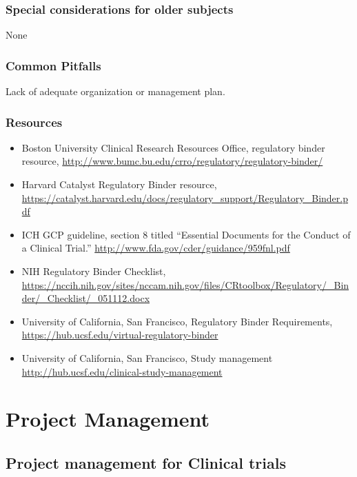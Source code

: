 \documentclass[]{book}
\providecommand{\tightlist}{%
  \setlength{\itemsep}{0pt}\setlength{\parskip}{0pt}}
\theoremstyle{definition}
\theoremstyle{definition}
\theoremstyle{definition}
\theoremstyle{remark}
\begin{document}
\subsection{Special considerations for older
subjects}\label{special-considerations-for-older-subjects-11}

None

\subsection{Common Pitfalls}\label{common-pitfalls-14}

Lack of adequate organization or management plan.

\subsection{Resources}\label{resources-16}

\begin{itemize}
\tightlist
\item
  Boston University Clinical Research Resources Office, regulatory
  binder resource,
  \url{http://www.bumc.bu.edu/crro/regulatory/regulatory-binder/}
\item
  Harvard Catalyst Regulatory Binder resource,
  \url{https://catalyst.harvard.edu/docs/regulatory_support/Regulatory_Binder.pdf}
\item
  ICH GCP guideline, section 8 titled ``Essential Documents for the
  Conduct of a Clinical Trial.''
  \url{http://www.fda.gov/cder/guidance/959fnl.pdf}
\item
  NIH Regulatory Binder Checklist,
  \url{https://nccih.nih.gov/sites/nccam.nih.gov/files/CRtoolbox/Regulatory/_Binder/_Checklist/_051112.docx}
\item
  University of California, San Francisco, Regulatory Binder
  Requirements, \url{https://hub.ucsf.edu/virtual-regulatory-binder}
\item
  University of California, San Francisco, Study management
  \url{http://hub.ucsf.edu/clinical-study-management}
\end{itemize}

\chapter{Project Management}\label{project-management}

\section{Project management for Clinical
trials}\label{project-management-for-clinical-trials}
\end{document}
